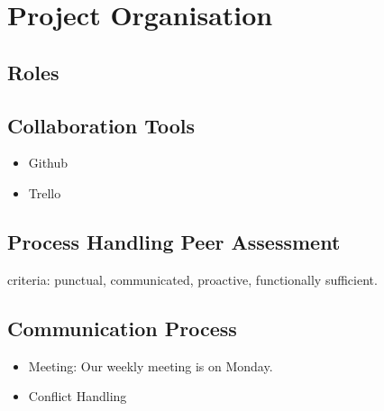 \documentclass[11pt]{article}
\begin{document}
\section{Project Organisation}
\subsection{Roles}
\subsection{Collaboration Tools}
\begin{itemize}
	\item Github
	\item Trello
\end{itemize}
\subsection{Process Handling Peer Assessment}
criteria: punctual, communicated, proactive, functionally sufficient. 
\subsection{Communication Process}
\begin{itemize}
	\item Meeting: Our weekly meeting is on Monday.
	\item Conflict Handling
\end{itemize}
\end{document}
